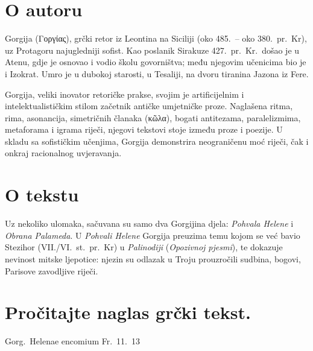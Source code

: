 \section*{O autoru}

Gorgija \textgreek[variant=ancient]{(Γοργίας),} grčki retor iz Leontina na Siciliji (oko 485.\ – oko 380.\ pr.~Kr), uz Protagoru najugledniji sofist. Kao poslanik Sirakuze 427.\ pr.~Kr.\ došao je u Atenu, gdje je osnovao i vodio školu govorništva; među njegovim učenicima bio je i Izokrat. Umro je u dubokoj starosti, u Tesaliji, na dvoru tiranina Jazona iz Fere.

Gorgija, veliki inovator retoričke prakse, svojim je artificijelnim i intelektualističkim stilom začetnik antičke umjetničke proze. Naglašena ritma, rima, asonancija, simetričnih članaka \textgreek[variant=ancient]{(κῶλα),} bogati antitezama, paralelizmima, metaforama i igrama riječi, njegovi tekstovi stoje između proze i poezije. U skladu sa sofističkim učenjima, Gorgija demonstrira neograničenu moć riječi, čak i onkraj racionalnog uvjeravanja.

\section*{O tekstu}

Uz nekoliko ulomaka, sačuvana su samo dva Gorgijina djela: \textit{Pohvala Helene} i \textit{Obrana Palameda}. U \textit{Pohvali Helene} Gorgija preuzima temu kojom se već bavio Stezihor (VII./VI.~st.\ pr.~Kr) u \textit{Palinodiji} (\textit{Opozivnoj pjesmi}), te dokazuje nevinost mitske ljepotice: njezin su odlazak u Troju prouzročili sudbina, bogovi, Parisove zavodljive riječi.


\section*{Pročitajte naglas grčki tekst.}
Gorg.\ Helenae encomium Fr.~11.~13

\medskip

